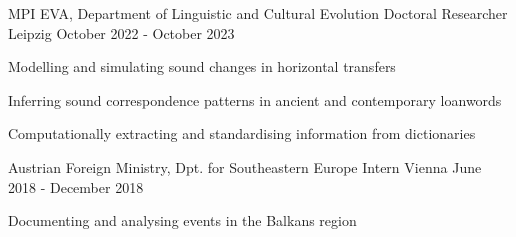 \begin{cventries}

  \cventry
    {MPI EVA, Department of Linguistic and Cultural Evolution} %
    {Doctoral Researcher} %
    {Leipzig} %
    {October 2022 - October 2023} %
    {
      \begin{cvitems} %
        \item{Modelling and simulating sound changes in horizontal transfers}
        \item{Inferring sound correspondence patterns in ancient and contemporary loanwords}
        \item{Computationally extracting and standardising information from dictionaries}
      \end{cvitems}
    }
    
  \cventry
    {Austrian Foreign Ministry, Dpt. for Southeastern Europe} %
    {Intern} %
    {Vienna} %
    {June 2018 - December 2018} %
    {
      \begin{cvitems} %
        \item{Documenting and analysing events in the Balkans region}
      \end{cvitems}
    }

    
\end{cventries}

